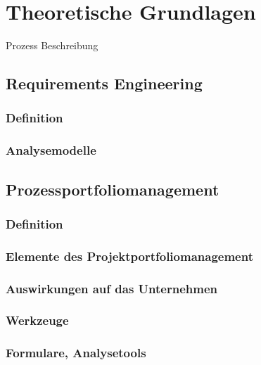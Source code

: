 \chapter{Theoretische Grundlagen}
%
\label{chp:TheoretischeGrundlagen}%

Prozess Beschreibung


\section{Requirements Engineering}
%
\label{sec:thg:req}%


\subsection{Definition}
\label{sec:thg:req:definition}%

\subsection{Analysemodelle}
\label{sec:thg:req:modelle}%



\section{Prozessportfoliomanagement}
%
%
\label{sec:thg:ppm}%


\subsection{Definition}
\label{sec:thg:ppm:definition}%


\subsection{Elemente des Projektportfoliomanagement}
\label{sec:thg:ppm:elemente}%

\subsection{Auswirkungen auf das Unternehmen}
\label{sec:thg:ppm:auswirkungen}%

\subsection{Werkzeuge}
\label{sec:thg:ppm:tools}%


\subsection{Formulare, Analysetools}
\label{sec:thg:ppm:forms}%
